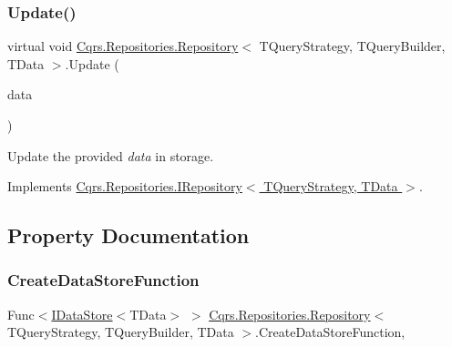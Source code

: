 \subsubsection{\texorpdfstring{Update()}{Update()}}
{\footnotesize\ttfamily virtual void \hyperlink{classCqrs_1_1Repositories_1_1Repository}{Cqrs.\+Repositories.\+Repository}$<$ T\+Query\+Strategy, T\+Query\+Builder, T\+Data $>$.Update (\begin{DoxyParamCaption}\item[{T\+Data}]{data }\end{DoxyParamCaption})\hspace{0.3cm}{\ttfamily [virtual]}}



Update the provided {\itshape data}  in storage. 



Implements \hyperlink{interfaceCqrs_1_1Repositories_1_1IRepository_af8a0b1cf5eedd7653d2867ab38657d46_af8a0b1cf5eedd7653d2867ab38657d46}{Cqrs.\+Repositories.\+I\+Repository$<$ T\+Query\+Strategy, T\+Data $>$}.



\subsection{Property Documentation}
\mbox{\label{classCqrs_1_1Repositories_1_1Repository_ae15cee6394a223564ad2ead65cd30189_ae15cee6394a223564ad2ead65cd30189}} 
\subsubsection{\texorpdfstring{Create\+Data\+Store\+Function}{CreateDataStoreFunction}}
{\footnotesize\ttfamily Func$<$\hyperlink{interfaceCqrs_1_1DataStores_1_1IDataStore}{I\+Data\+Store}$<$T\+Data$>$ $>$ \hyperlink{classCqrs_1_1Repositories_1_1Repository}{Cqrs.\+Repositories.\+Repository}$<$ T\+Query\+Strategy, T\+Query\+Builder, T\+Data $>$.Create\+Data\+Store\+Function\hspace{0.3cm}{\ttfamily [get]}, {\ttfamily [protected]}}



